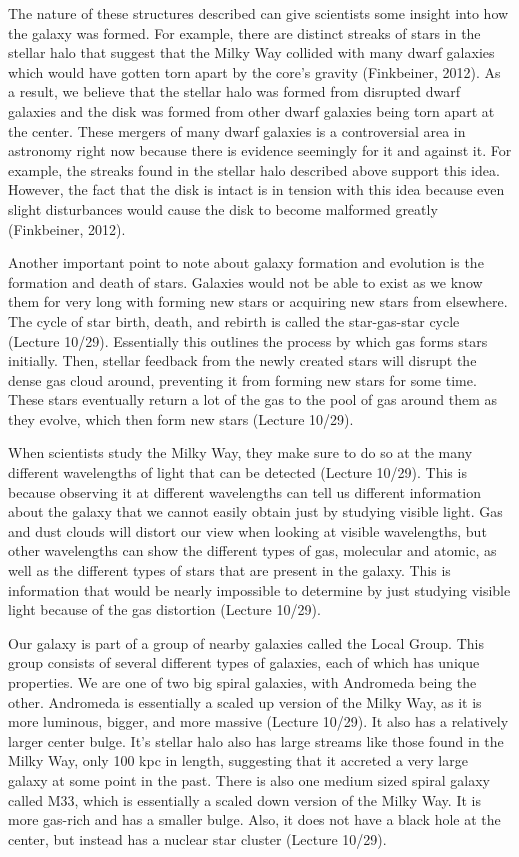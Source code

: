 \documentclass[12pt]{article}
\begin{document}
The nature of these structures described can give scientists some insight into
how the galaxy was formed.  For example, there are distinct streaks of stars in
the stellar halo that suggest that the Milky Way collided with many dwarf
galaxies which would have gotten torn apart by the core's gravity (Finkbeiner,
2012).  As a result,
we believe that the stellar halo was formed from disrupted dwarf galaxies and
the disk was formed from other dwarf galaxies being torn apart at the center.
These mergers of many dwarf galaxies is a controversial area in astronomy right
now because there is evidence seemingly for it and against it.  For example, the
streaks found in the stellar halo described above support this idea.  However,
the fact that the disk is intact is in tension with this idea because even
slight disturbances would cause the disk to become malformed greatly
(Finkbeiner, 2012).

Another important point to note about galaxy formation and evolution is the
formation and death of stars.  Galaxies would not be able to exist as we know
them for very long with forming new stars or acquiring new stars from elsewhere.
The cycle of star birth, death, and rebirth is called the star-gas-star cycle
(Lecture 10/29).
Essentially this outlines the process by which gas forms stars initially.  Then,
stellar feedback from the newly created stars will disrupt the dense gas cloud
around, preventing it from forming new stars for some time.  These stars
eventually return a lot of the gas to the pool of gas around them as they
evolve, which then form new stars (Lecture 10/29).

When scientists study the Milky Way, they make sure to do so at the many
different
wavelengths of light that can be detected (Lecture 10/29).  This is because
observing it at
different wavelengths can tell us different information about the galaxy that we
cannot easily obtain just by studying visible light.  Gas and dust clouds will
distort our view when looking at visible wavelengths, but other wavelengths can
show the different types of gas, molecular and atomic, as well as the different
types of stars that are present in the galaxy.  This is information that would
be nearly impossible to determine by just studying visible light because of the
gas distortion (Lecture 10/29).

Our galaxy is part of a group of nearby galaxies called the Local Group.  This
group consists of several different types of galaxies, each of which has unique
properties.  We are one of two big spiral galaxies, with Andromeda being the
other.  Andromeda is essentially a scaled up version of the Milky Way, as it is
more luminous, bigger, and more massive (Lecture 10/29).  It also has a
relatively larger center
bulge.  It's stellar halo also has large streams like those found in the Milky
Way, only 100 kpc in length, suggesting that it accreted a very large galaxy at
some point in the past.  There is also one medium sized spiral galaxy called
M33, which is essentially a scaled down version of the Milky Way.  It is more
gas-rich and has a smaller bulge.  Also, it does not have a black hole at the
center, but instead has a nuclear star cluster (Lecture 10/29).
\end{document}
